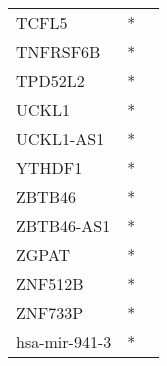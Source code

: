 \begin{longtable}{lcc}
TCFL5          &  * &         \\
TNFRSF6B       &  * &         \\
TPD52L2        &  * &         \\
UCKL1          &  * &         \\
UCKL1-AS1      &  * &         \\
YTHDF1         &  * &         \\
ZBTB46         &  * &         \\
ZBTB46-AS1     &  * &         \\
ZGPAT          &  * &         \\
ZNF512B        &  * &         \\
ZNF733P        &  * &         \\
hsa-mir-941-3  &  * &         \\
\end{longtable}

